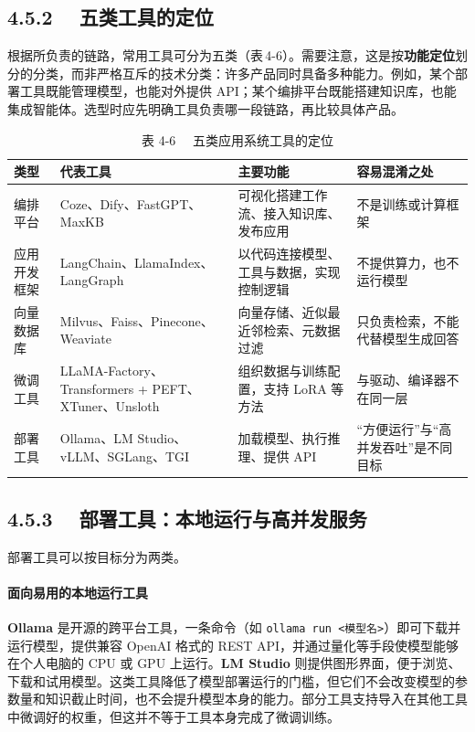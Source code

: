 \documentclass{article}
\begin{document}
\subsection*{4.5.2　 五类工具的定位}


根据所负责的链路，常用工具可分为五类（表\,4-6）。需要注意，这是按\textbf{功能定位}划分的分类，而非严格互斥的技术分类：许多产品同时具备多种能力。例如，某个部署工具既能管理模型，也能对外提供 API；某个编排平台既能搭建知识库，也能集成智能体。选型时应先明确工具负责哪一段链路，再比较具体产品。

\begin{table}[htbp]
\centering
\caption{表 4-6　 五类应用系统工具的定位}

\begin{tabular}{l l l l}
\toprule
类型 & 代表工具 & 主要功能 & 容易混淆之处 \\
\midrule
编排平台 & Coze、Dify、FastGPT、MaxKB & 可视化搭建工作流、接入知识库、发布应用 & 不是训练或计算框架 \\
应用开发框架 & LangChain、LlamaIndex、LangGraph & 以代码连接模型、工具与数据，实现控制逻辑 & 不提供算力，也不运行模型 \\
向量数据库 & Milvus、Faiss、Pinecone、Weaviate & 向量存储、近似最近邻检索、元数据过滤 & 只负责检索，不能代替模型生成回答 \\
微调工具 & LLaMA-Factory、Transformers + PEFT、XTuner、Unsloth & 组织数据与训练配置，支持 LoRA 等方法 & 与驱动、编译器不在同一层 \\
部署工具 & Ollama、LM Studio、vLLM、SGLang、TGI & 加载模型、执行推理、提供 API & “方便运行”与“高并发吞吐”是不同目标 \\
\bottomrule
\end{tabular}
\end{table}

\subsection*{4.5.3　 部署工具：本地运行与高并发服务}


部署工具可以按目标分为两类。

\paragraph{面向易用的本地运行工具} \textbf{Ollama} 是开源的跨平台工具，一条命令（如 \texttt{ollama run <模型名>}）即可下载并运行模型，提供兼容 OpenAI 格式的 REST API，并通过量化等手段使模型能够在个人电脑的 CPU 或 GPU 上运行。\textbf{LM Studio} 则提供图形界面，便于浏览、下载和试用模型。这类工具降低了模型部署运行的门槛，但它们不会改变模型的参数量和知识截止时间，也不会提升模型本身的能力。部分工具支持导入在其他工具中微调好的权重，但这并不等于工具本身完成了微调训练。
\end{document}
